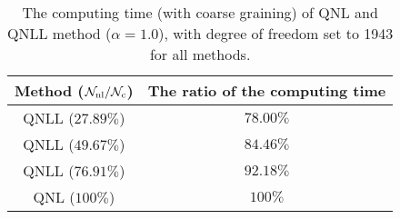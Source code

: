 \begin{table}
	\centering
	\renewcommand{\arraystretch}{1.5} %
	\begin{tabular}{|c|c|} %
		\hline %
		Method ($\mathcal{N}_{{\rm nl}}/\mathcal{N}_{{\rm c}}$) & The ratio of the computing time\\ %
		\hline %
		QNLL ($27.89\%$) & $78.00\%$ \\ %
		QNLL ($49.67\%$) & $84.46\%$ \\ %
		QNLL ($76.91\%$) & $92.18\%$ \\ %
		QNL ($100\%$) & $100\%$ \\ %
		\hline %
	\end{tabular}
	\caption{The computing time (with coarse graining) of QNL and QNLL method ($\alpha = 1.0$), with degree of freedom set to 1943 for all methods.}
	\label{tab:computing time alpha10 CG}
\end{table}


